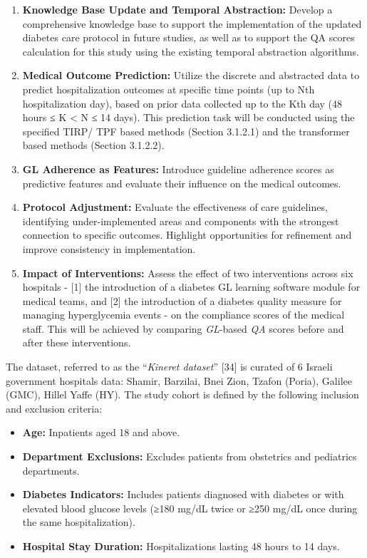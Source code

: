 \documentclass[
]{article}
\begin{document}
\begin{enumerate}
\def\labelenumi{\arabic{enumi}.}
\item
  \textbf{Knowledge Base Update and Temporal Abstraction:} Develop a
  comprehensive knowledge base to support the implementation of the
  updated diabetes care protocol in future studies, as well as to
  support the QA scores calculation for this study using the existing
  temporal abstraction algorithms.
\item
  \textbf{Medical Outcome Prediction:} Utilize the discrete and
  abstracted data to predict hospitalization outcomes at specific time
  points (up to Nth hospitalization day), based on prior data collected
  up to the Kth day (48 hours ≤ K \textless{} N ≤ 14 days). This
  prediction task will be conducted using the specified TIRP/ TPF based
  methods (Section 3.1.2.1) and the transformer based methods (Section
  3.1.2.2).
\item
  \textbf{GL Adherence as Features:} Introduce guideline adherence
  scores as predictive features and evaluate their influence on the
  medical outcomes.
\item
  \textbf{Protocol Adjustment:} Evaluate the effectiveness of care
  guidelines, identifying under-implemented areas and components with
  the strongest connection to specific outcomes. Highlight opportunities
  for refinement and improve consistency in implementation.
\item
  \textbf{Impact of Interventions:} Assess the effect of two
  interventions across six hospitals - {[}1{]} the introduction of a
  diabetes GL learning software module for medical teams, and {[}2{]}
  the introduction of a diabetes quality measure for managing
  hyperglycemia events - on the compliance scores of the medical staff.
  This will be achieved by comparing \emph{GL}-based \emph{QA} scores
  before and after these interventions.
\end{enumerate}

The dataset, referred to as the ``\emph{Kineret dataset}'' {[}34{]} is
curated of 6 Israeli government hospitals data: Shamir, Barzilai, Bnei
Zion, Tzafon (Poria), Galilee (GMC), Hillel Yaffe (HY). The study cohort
is defined by the following inclusion and exclusion criteria:

\begin{itemize}
\item
  \textbf{Age:} Inpatients aged 18 and above.
\item
  \textbf{Department Exclusions:} Excludes patients from obstetrics and
  pediatrics departments.
\item
  \textbf{Diabetes Indicators:} Includes patients diagnosed with
  diabetes or with elevated blood glucose levels (≥180 mg/dL twice or
  ≥250 mg/dL once during the same hospitalization).
\item
  \textbf{Hospital Stay Duration:} Hospitalizations lasting 48 hours to
  14 days.
\end{itemize}
\end{document}
